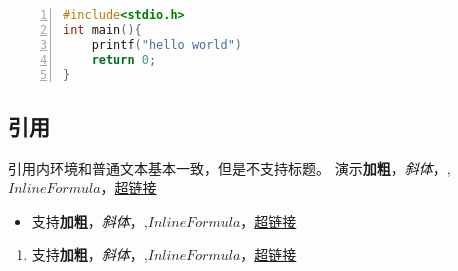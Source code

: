 \documentclass[UTF8]{ctexart}
\newenvironment{marktext}{}{}
\renewenvironment{shaded}{
                     \def\FrameCommand{\fboxsep=\FrameSep \colorbox{shadecolor}}
                     \MakeFramed{\advance\hsize-\width \FrameRestore\FrameRestore}}
                    {\endMakeFramed}
\begin{document}
\begin{lstlisting}[language={C++},keywordstyle=\color{blue!70},frame=shadowbox,showstringspaces=false,commentstyle=\color{red!50!green!50!blue!50},escapeinside=``,numbers=left,numberstyle=\small,basicstyle=\small]
#include<stdio.h>
int main(){
	printf("hello world")
	return 0;
}

\end{lstlisting}
\begin{marktext}


\subsection{引用}


\end{marktext}
\begin{shaded}
\begin{marktext}
引用内环境和普通文本基本一致，但是不支持标题。
演示\textbf{加粗}，\textit{斜体}，,$Inline Formula$，\href{http:///www.github.com}{超链接}
\end{marktext}


\begin{itemize}
\item
支持\textbf{加粗}，\textit{斜体}，,$Inline Formula$，\href{http:///www.github.com}{超链接}
\end{itemize}


\begin{enumerate}
\item
支持\textbf{加粗}，\textit{斜体}，,$Inline Formula$，\href{http:///www.github.com}{超链接}
\end{enumerate}






\end{shaded}
\end{document}
